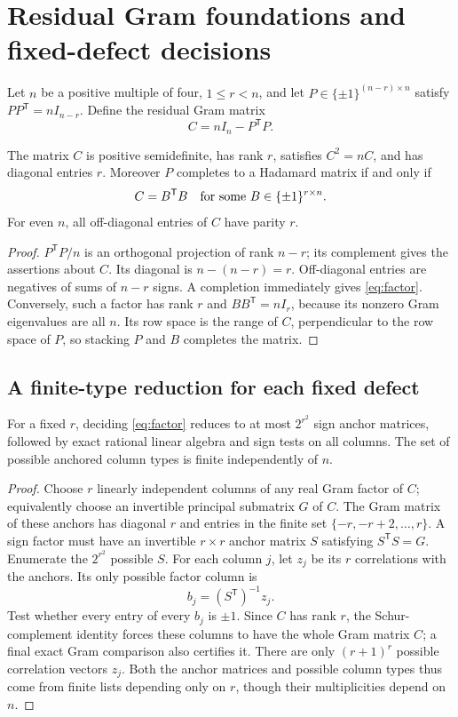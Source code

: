 \section{Residual Gram foundations and fixed-defect decisions}
Let $n$ be a positive multiple of four, $1\le r<n$, and let
$P\in\{\pm1\}^{(n-r)\times n}$ satisfy
$PP^{\mathsf T}=nI_{n-r}$. Define the residual Gram matrix
\[
 C=nI_n-P^{\mathsf T}P.
\]
\begin{proposition}\label{prop:residual}
The matrix $C$ is positive semidefinite, has rank $r$, satisfies
$C^2=nC$, and has diagonal entries $r$. Moreover $P$ completes to a
Hadamard matrix if and only if
\begin{equation}\label{eq:factor}
 C=B^{\mathsf T}B\quad\hbox{for some }B\in\{\pm1\}^{r\times n}.
\end{equation}
For even $n$, all off-diagonal entries of $C$ have parity $r$.
\end{proposition}
\begin{proof}
$P^{\mathsf T}P/n$ is an orthogonal projection of rank $n-r$; its
complement gives the assertions about $C$. Its diagonal is
$n-(n-r)=r$. Off-diagonal entries are negatives of sums of $n-r$
signs. A completion immediately gives \eqref{eq:factor}. Conversely,
such a factor has rank $r$ and $BB^{\mathsf T}=nI_r$, because its
nonzero Gram eigenvalues are all $n$. Its row space is the range of
$C$, perpendicular to the row space of $P$, so stacking $P$ and $B$
completes the matrix.
\end{proof}

\subsection{A finite-type reduction for each fixed defect}
\begin{proposition}\label{prop:anchor}
For a fixed $r$, deciding \eqref{eq:factor} reduces to at most
$2^{r^2}$ sign anchor matrices, followed by exact rational linear
algebra and sign tests on all columns. The set of possible anchored
column types is finite independently of $n$.
\end{proposition}
\begin{proof}
Choose $r$ linearly independent columns of any real Gram factor of
$C$; equivalently choose an invertible principal submatrix $G$ of $C$.
The Gram matrix of these anchors has diagonal $r$ and entries in the
finite set $\{-r,-r+2,\ldots,r\}$. A sign factor must have an
invertible $r\times r$ anchor matrix $S$ satisfying $S^{\mathsf T}S=G$.
Enumerate the $2^{r^2}$ possible $S$. For each column $j$, let $z_j$
be its $r$ correlations with the anchors. Its only possible factor
column is
\[
 b_j=(S^{\mathsf T})^{-1}z_j.
\]
Test whether every entry of every $b_j$ is $\pm1$. Since $C$ has rank
$r$, the Schur-complement identity forces these columns to have the
whole Gram matrix $C$; a final exact Gram comparison also certifies it.
There are only $(r+1)^r$ possible correlation vectors $z_j$. Both the
anchor matrices and possible column types thus come from finite lists
depending only on $r$, though their multiplicities depend on $n$.
\end{proof}

